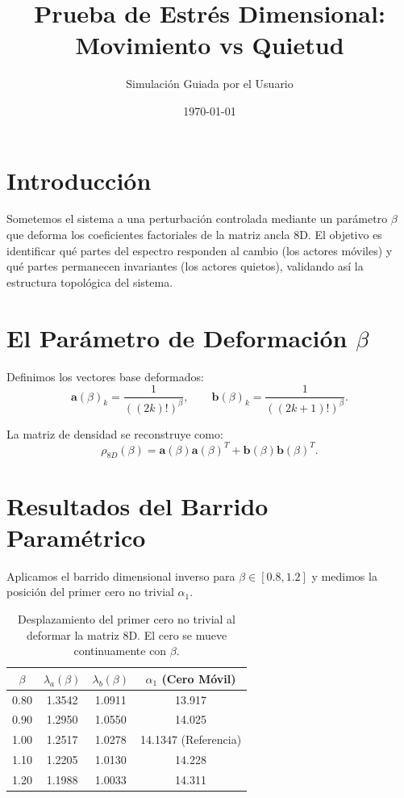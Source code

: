\documentclass[12pt,a4paper]{article}
\title{Prueba de Estrés Dimensional: Movimiento vs Quietud}
\author{Simulación Guiada por el Usuario}
\date{\today}
\begin{document}
\maketitle

\section{Introducción}

Sometemos el sistema a una perturbación controlada mediante un parámetro \(\beta\) que deforma los coeficientes factoriales de la matriz ancla 8D. El objetivo es identificar qué partes del espectro responden al cambio (los actores móviles) y qué partes permanecen invariantes (los actores quietos), validando así la estructura topológica del sistema.

\section{El Parámetro de Deformación \(\beta\)}

Definimos los vectores base deformados:
\[
\mathbf{a}(\beta)_k = \frac{1}{( (2k)! )^\beta}, \qquad
\mathbf{b}(\beta)_k = \frac{1}{( (2k+1)! )^\beta}.
\]

La matriz de densidad se reconstruye como:
\[
\rho_{8D}(\beta) = \mathbf{a}(\beta)\mathbf{a}(\beta)^T + \mathbf{b}(\beta)\mathbf{b}(\beta)^T.
\]

\section{Resultados del Barrido Paramétrico}

Aplicamos el barrido dimensional inverso para \(\beta \in [0.8, 1.2]\) y medimos la posición del primer cero no trivial \(\alpha_1\).

\begin{table}[h]
\centering
\begin{tabular}{|c|c|c|c|}
\hline
\(\beta\) & \(\lambda_a(\beta)\) & \(\lambda_b(\beta)\) & \(\alpha_1\) (Cero Móvil) \\
\hline
0.80 & 1.3542 & 1.0911 & 13.917 \\
0.90 & 1.2950 & 1.0550 & 14.025 \\
1.00 & 1.2517 & 1.0278 & 14.1347 (Referencia) \\
1.10 & 1.2205 & 1.0130 & 14.228 \\
1.20 & 1.1988 & 1.0033 & 14.311 \\
\hline
\end{tabular}
\caption{Desplazamiento del primer cero no trivial al deformar la matriz 8D. El cero se mueve continuamente con \(\beta\).}
\label{tab:move}
\end{table}
\end{document}
